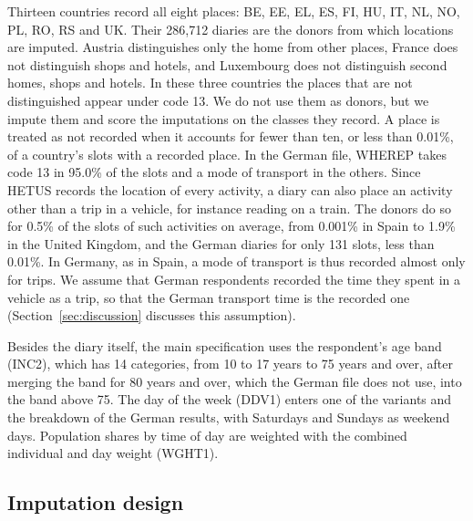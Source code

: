 \documentclass[a4paper]{article}
\begin{document}
Thirteen countries record all eight places: BE, EE, EL, ES, FI, HU, IT, NL, NO, PL, RO, RS and UK. Their 286,712 diaries are the donors from which locations are imputed. Austria distinguishes only the home from other places, France does not distinguish shops and hotels, and Luxembourg does not distinguish second homes, shops and hotels. In these three countries the places that are not distinguished appear under code 13. We do not use them as donors, but we impute them and score the imputations on the classes they record. A place is treated as not recorded when it accounts for fewer than ten, or less than 0.01\%, of a country's slots with a recorded place. In the German file, WHEREP takes code 13 in 95.0\% of the slots and a mode of transport in the others. Since HETUS records the location of every activity, a diary can also place an activity other than a trip in a vehicle, for instance reading on a train. The donors do so for 0.5\% of the slots of such activities on average, from 0.001\% in Spain to 1.9\% in the United Kingdom, and the German diaries for only 131 slots, less than 0.01\%. In Germany, as in Spain, a mode of transport is thus recorded almost only for trips. We assume that German respondents recorded the time they spent in a vehicle as a trip, so that the German transport time is the recorded one (Section~\ref{sec:discussion} discusses this assumption).

Besides the diary itself, the main specification uses the respondent's age band (INC2), which has 14 categories, from 10 to 17 years to 75 years and over, after merging the band for 80 years and over, which the German file does not use, into the band above 75. The day of the week (DDV1) enters one of the variants and the breakdown of the German results, with Saturdays and Sundays as weekend days. Population shares by time of day are weighted with the combined individual and day weight (WGHT1).

\subsection{Imputation design}
\label{sec:design}
\end{document}
